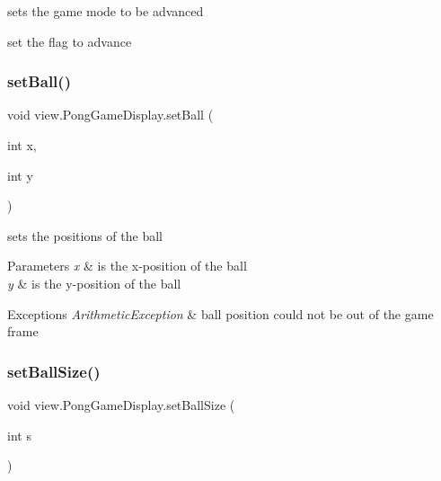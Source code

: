 sets the game mode to be advanced 

set the flag to advance \hypertarget{classview_1_1_pong_game_display_ac6afa3842b0a26be46dd0b7d202d887d}{}\label{classview_1_1_pong_game_display_ac6afa3842b0a26be46dd0b7d202d887d} 
\subsubsection{\texorpdfstring{set\+Ball()}{setBall()}}
{\footnotesize\ttfamily void view.\+Pong\+Game\+Display.\+set\+Ball (\begin{DoxyParamCaption}\item[{int}]{x,  }\item[{int}]{y }\end{DoxyParamCaption})}



sets the positions of the ball 


\begin{DoxyParams}{Parameters}
{\em x} & is the x-\/position of the ball \\
\hline
{\em y} & is the y-\/position of the ball \\
\hline
\end{DoxyParams}

\begin{DoxyExceptions}{Exceptions}
{\em Arithmetic\+Exception} & ball position could not be out of the game frame \\
\hline
\end{DoxyExceptions}
\hypertarget{classview_1_1_pong_game_display_a295d4a14e718454eb223a5bb06141d53}{}\label{classview_1_1_pong_game_display_a295d4a14e718454eb223a5bb06141d53} 
\subsubsection{\texorpdfstring{set\+Ball\+Size()}{setBallSize()}}
{\footnotesize\ttfamily void view.\+Pong\+Game\+Display.\+set\+Ball\+Size (\begin{DoxyParamCaption}\item[{int}]{s }\end{DoxyParamCaption})}



